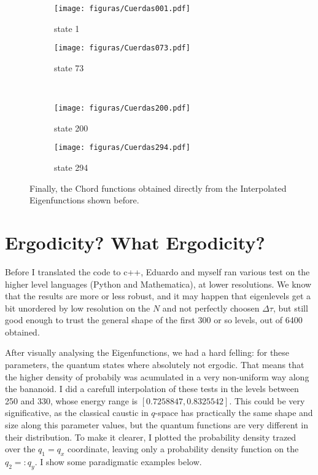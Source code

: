 \documentclass[a4paper,12pt]{article}
\newcommand{\dt}{\Delta\tau}
\begin{document}
\begin{figure}[h]
  \centering
  \begin{subfigure}[b]{0.48\textwidth}
    \texttt{[image: figuras/Cuerdas001.pdf]}
    \caption{state 1}
    \label{fig:gull}
  \end{subfigure}%
  \begin{subfigure}[b]{0.48\textwidth}
    \texttt{[image: figuras/Cuerdas073.pdf]}
    \caption{state 73}
    \label{fig:tiger}
  \end{subfigure}\\
  \begin{subfigure}[b]{0.48\textwidth}
    \texttt{[image: figuras/Cuerdas200.pdf]}
    \caption{state 200}
    \label{fig:mouse}
  \end{subfigure}
  \begin{subfigure}[b]{0.48\textwidth}
    \texttt{[image: figuras/Cuerdas294.pdf]}
    \caption{state 294}
    \label{fig:mouse}
  \end{subfigure}
  \caption{Finally, the Chord functions obtained directly from the Interpolated
Eigenfunctions shown before. } 
  \label{SomeChords}
\end{figure}

\section{Ergodicity? What Ergodicity?}

Before I translated the code to c++, Eduardo and myself ran various
test on the higher level languages (Python and Mathematica), at lower
resolutions. We know that the results are more or less robust, and
it may happen that eigenlevels get a bit unordered by low resolution
on the $N$ and not perfectly choosen $\dt$, but still good enough to 
trust the general shape of the first 300 or so levels, out of 6400 obtained.

After visually analysing the Eigenfunctions, we had a hard felling:
for these parameters, the quantum states where absolutely not ergodic. 
That means that the higher density of probabily was acumulated 
in a very non-uniform way along the bananoid. I did a carefull
interpolation of these tests in the levels between 250 and 330, whose
energy range is $[0.7258847, 0.8325542]$. This could be very significative,
as the classical caustic in $q$-space  
has practically the same shape and size along
this parameter values, but the quantum functions are very  different in
their distribution. To make it clearer, I plotted the probability density
trazed over the $q_1=q_x$ coordinate, leaving only a probability density
function on the $q_2=:q_y$. I show some paradigmatic examples below.
\end{document}
